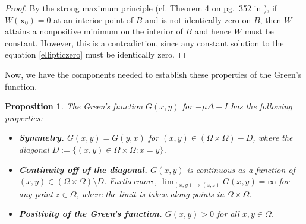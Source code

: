 \documentclass[12pt]{article}
\newcommand{\bd}{\boldsymbol}
\theoremstyle{plain}
\newtheorem{proposition}{Proposition}[section]
\begin{document}
\begin{proof}
By the strong maximum principle (cf. Theorem 4 on pg.~352 in \cite{Evans}), if $W(\bd{x}_0) = 0$ at an interior point of $B$ and is not identically zero on $B$, then $W$ attains a nonpositive minimum on the interior of $B$ and hence $W$ must be constant. However, this is a contradiction, since any constant solution to the equation \eqref{ellipticzero} must be identically zero.
\end{proof}

Now, we have the components needed to establish these properties of the Green's function.

\begin{proposition}\label{greenproperties}
The Green's function $G(x, y)$ for $-\mu \Delta + I$ has the following properties:
\begin{itemize}
    \item \textbf{Symmetry.} $G(x, y) = G(y, x)$ for $(x, y) \in (\Omega \times \Omega) - D$, where the diagonal $D := \{(x, y) \in \Omega \times \Omega : x = y\}$.
    \item \textbf{Continuity off of the diagonal.} $G(x, y)$ is continuous as a function of $(x, y) \in (\Omega \times \Omega) \setminus D$. Furthermore, $\lim_{(x, y) \to (z, z)} G(x, y) = \infty$ for any point $z \in \Omega$, where the limit is taken along points in $\Omega \times \Omega$.
    \item \textbf{Positivity of the Green's function.} $G(x, y) > 0$ for all $x, y \in \Omega$.
\end{itemize}
\end{proposition}
\end{document}
